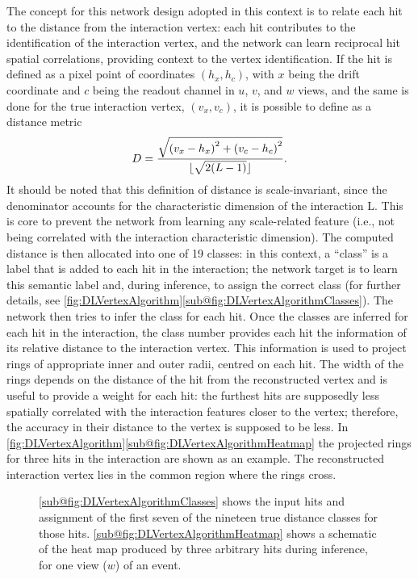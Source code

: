 The concept for this network design adopted in this context is to relate each hit to the distance from the interaction vertex: each hit contributes to the identification of the interaction vertex, and the network can learn reciprocal hit spatial correlations, providing context to the vertex identification. If the hit is defined as a pixel point of coordinates $(h_x, h_c)$, with $x$ being the drift coordinate and $c$ being the readout channel in $u$, $v$, and $w$ views, and the same is done for the true interaction vertex, $(v_x, v_c)$, it is possible to define as a distance metric \begin{equation}
    D = \frac{\sqrt{\qty(v_x - h_x)^2 + \qty(v_c - h_c)^2}}{\lfloor\sqrt{2\qty(L - 1)}\rfloor}.
\end{equation} It should be noted that this definition of distance is scale-invariant, since the denominator accounts for the characteristic dimension of the interaction L. This is core to prevent the network from learning any scale-related feature (i.e., not being correlated with the interaction characteristic dimension). The computed distance is then allocated into one of 19 classes: in this context, a ``class'' is a label that is added to each hit in the interaction; the network target is to learn this semantic label and, during inference, to assign the correct class (for further details, see \autoref{fig:DLVertexAlgorithm}\ref{sub@fig:DLVertexAlgorithmClasses}). The network then tries to infer the class for each hit. Once the classes are inferred for each hit in the interaction, the class number provides each hit the information of its relative distance to the interaction vertex. This information is used to project rings of appropriate inner and outer radii, centred on each hit. The width of the rings depends on the distance of the hit from the reconstructed vertex and is useful to provide a weight for each hit: the furthest hits are supposedly less spatially correlated with the interaction features closer to the vertex; therefore, the accuracy in their distance to the vertex is supposed to be less. In \autoref{fig:DLVertexAlgorithm}\ref{sub@fig:DLVertexAlgorithmHeatmap} the projected rings for three hits in the interaction are shown as an example. The reconstructed interaction vertex lies in the common region where the rings cross. 

\begin{figure}
    \centering
    \caption[Working principle of the DL vertex algorithm]{\ref{sub@fig:DLVertexAlgorithmClasses} shows the input hits and assignment of the first seven of the nineteen true distance classes for those hits. \ref{sub@fig:DLVertexAlgorithmHeatmap} shows a schematic of the heat map produced by three arbitrary hits during inference, for one view ($w$) of an event. }
    \label{fig:DLVertexAlgorithm}
\end{figure}

